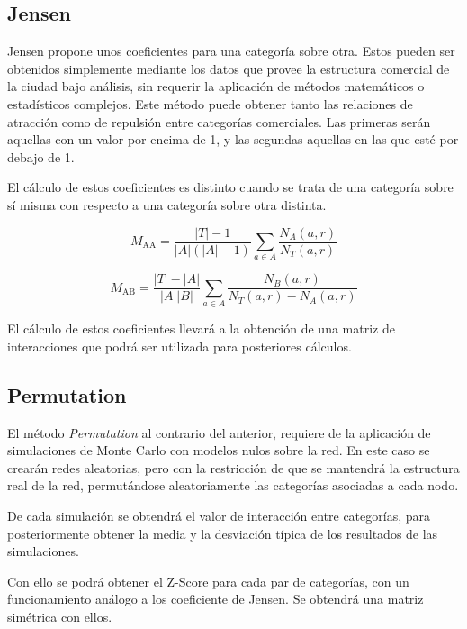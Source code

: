 \subsection{Jensen}


Jensen propone unos coeficientes para una categoría sobre otra. Estos pueden ser obtenidos simplemente mediante los datos que provee la estructura comercial de la ciudad bajo análisis, sin requerir la aplicación de métodos matemáticos o estadísticos complejos. Este método puede obtener tanto las relaciones de atracción como de repulsión entre categorías comerciales. Las primeras serán aquellas con un valor por encima de 1, y las segundas aquellas en las que esté por debajo de 1.

El cálculo de estos coeficientes es distinto cuando se trata de una categoría sobre sí misma con respecto a una categoría sobre otra distinta.

\begin{equation*}
	M_\text{AA} = \frac{|T| - 1}{|A|(|A|-1)} \sum_{a \in A}\frac{N_A(a,r)}{N_T(a,r)}
\end{equation*}

\begin{equation*}
	M_\text{AB} = \frac{|T| - |A|}{|A||B|} \sum_{a \in A}\frac{N_B(a,r)}{N_T(a,r) - N_A(a,r)}
\end{equation*}

El cálculo de estos coeficientes llevará a la obtención de una matriz de interacciones que podrá ser utilizada para posteriores cálculos.

\subsection{Permutation}

El método \textit{Permutation} al contrario del anterior, requiere de la aplicación de simulaciones de Monte Carlo con modelos nulos sobre la red. En este caso se crearán redes aleatorias, pero con la restricción de que se mantendrá la estructura real de la red, permutándose aleatoriamente las categorías asociadas a cada nodo.

De cada simulación se obtendrá el valor de interacción entre categorías, para posteriormente obtener la media y la desviación típica de los resultados de las simulaciones.

Con ello se podrá obtener el Z-Score para cada par de categorías, con un funcionamiento análogo a los coeficiente de Jensen. Se obtendrá una matriz simétrica con ellos.


